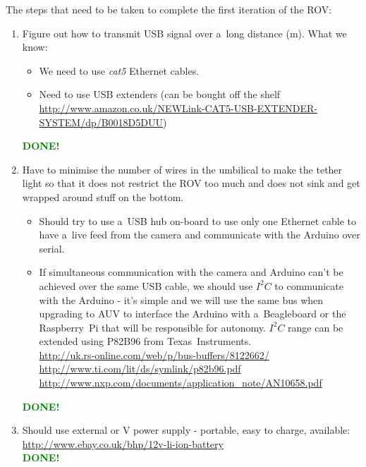 \documentclass[11pt,a4paper,oneside]{report}
\begin{document}
The steps that need to be taken to complete the first iteration of the ROV:

\begin{enumerate}
\item Figure out how to transmit USB signal over a~long distance (\unit[50]{m}). What we know:
	\begin{itemize}
	\item We need to use \emph{cat5} Ethernet cables.
	\item Need to use USB extenders (can be bought off the shelf \\
		\url{http://www.amazon.co.uk/NEWLink-CAT5-USB-EXTENDER-SYSTEM/dp/B0018D5DUU})
	\end{itemize}
	\textcolor{green}{\textbf{DONE!}}
	
\item Have to minimise the number of wires in the umbilical to make the tether light
	so that it does not restrict the ROV too much and does not sink and get wrapped around stuff on the bottom.
	\begin{itemize}
	\item Should try to use a~USB hub on-board to use only one Ethernet cable to have
		a~live feed from the camera and communicate with the Arduino over serial.
	\item If simultaneous communication with the camera and Arduino can't be achieved over
		the same USB cable, we should use $I^2C$ to communicate with the Arduino - it's simple
		and we will use the same bus when upgrading to AUV to interface the Arduino with
		a~Beagleboard or the Raspberry~Pi that will be responsible for autonomy.
		$I^2C$ range can be extended using P82B96 from Texas~Instruments. \\
			\url{http://uk.rs-online.com/web/p/bus-buffers/8122662/} \\
			\url{http://www.ti.com/lit/ds/symlink/p82b96.pdf} \\
			\url{http://www.nxp.com/documents/application_note/AN10658.pdf}
	\end{itemize}
	\textcolor{green}{\textbf{DONE!}}
	
\item Should use external \unit[9]{} or \unit[12]{V} power supply - portable,
	easy to charge, available: \\
	\url{http://www.ebay.co.uk/bhp/12v-li-ion-battery}
	\\ \textcolor{green}{\textbf{DONE!}}


\end{enumerate}
\end{document}
